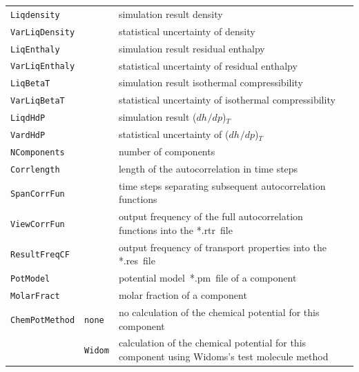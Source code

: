 \begin{landscape}
\begin{longtable}{llll}
		\texttt{Liqdensity}                 &           & simulation result density                                 &  \\
		\texttt{VarLiqDensity}              &           & statistical uncertainty of density      &  \\
		\texttt{LiqEnthaly}                 &           & simulation result residual enthalpy                       &  \\
		\texttt{VarLiqEnthaly}              &           & statistical uncertainty of residual enthalpy              &  \\
		\texttt{LiqBetaT}                   &           & simulation result isothermal compressibility              &  \\
		\texttt{VarLiqBetaT}                &           & statistical uncertainty of isothermal compressibility     &  \\
		\texttt{LiqdHdP}                    &           & simulation result ($dh^{\mathrm{ }}/dp$)$_T$               &  \\
		\onehalfspacing \texttt{VardHdP}    &           & statistical uncertainty of ($dh^{\mathrm{}}/dp$)$_T$  &  \\
		\midrule
		\onehalfspacing \texttt{NComponents} &           & number of components  &   \\
		\midrule
		\texttt{Corrlength}                 &           & length of the autocorrelation in time steps               &   \\
		\texttt{SpanCorrFun}                &           & time steps separating subsequent autocorrelation functions&   \\
		\texttt{ViewCorrFun}                &           & output frequency of the full autocorrelation functions into the *.rtr~file      &   \\
		\onehalfspacing \texttt{ResultFreqCF} &          & output frequency of transport properties into the *.res~file          &   \\
		\midrule
		\texttt{PotModel}                   &           & potential model~*.pm~file of a component                   &   \\
		\texttt{MolarFract}                  &           & molar fraction of a component                             &   \\
		\texttt{ChemPotMethod}              & \texttt{none}      & no calculation of the chemical potential for this component   &  \\
		& \texttt{Widom}     & calculation of the chemical potential for this component using Widoms's test molecule method & \\

\end{longtable}
\end{landscape}
